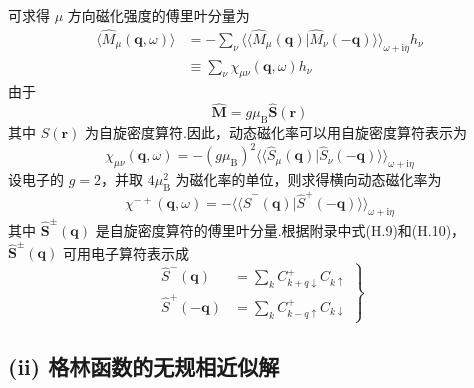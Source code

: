 可求得 $\mu$ 方向磁化强度的傅里叶分量为
\begin{equation}
\begin{aligned}
  \langle\hat{M}_{\mu}(\boldsymbol{q},\omega)\rangle&=-\sum_{\nu}
  \langle\langle\hat{M}_{\mu}(\boldsymbol{q})|\hat{M}_{\nu}(-\boldsymbol{q})\rangle\rangle_{\omega+\mathrm{i}\eta}h_{\nu}\\
  &\equiv\sum_{\nu}\chi_{\mu\nu}(\boldsymbol{q},\omega)h_{\nu}
\end{aligned}
\end{equation}
由于
\begin{equation}
  \hat{\boldsymbol{M}}=g\mu_{\mathrm{B}}\hat{\boldsymbol{S}}(\boldsymbol{r})
\end{equation}
其中 $S(\boldsymbol{r})$ 为自旋密度算符.因此，动态磁化率可以用自旋密度算符表示为
\begin{equation}
  \chi_{\mu\nu}(\boldsymbol{q},\omega)=-(g\mu_{\mathrm{B}})^{2}
  \langle\langle\hat{S}_{\mu}(\boldsymbol{q})|\hat{S}_{\nu}(-\boldsymbol{q})\rangle\rangle_{\omega+\mathrm{i}\eta}
\end{equation}
设电子的 $g=2$，并取 $4\mu_{\mathrm{B}}^{2}$ 为磁化率的单位，则求得横向动态磁化率为
\begin{equation}
  \chi^{-+}(\boldsymbol{q},\omega)=-\langle\langle\hat{S}^{-}(\boldsymbol{q})|\hat{S}^{+}(-\boldsymbol{q})\rangle\rangle_{\omega+\mathrm{i}\eta}
\end{equation}
其中 $\hat{\boldsymbol{S}}^{\pm}(\boldsymbol{q})$ 是自旋密度算符的傅里叶分量.根据附录中式(H.9)和(H.10)，$\hat{\boldsymbol{S}}^{\pm}(\boldsymbol{q})$ 可用电子算符表示成
\begin{equation}
\left.\begin{aligned}
  \hat{S}^{-}(\boldsymbol{q})&=\sum_{k}C_{k+q\downarrow}^{+}C_{k\uparrow}\\
  \hat{S}^{+}(-\boldsymbol{q})&=\sum_{k}C_{k-q\uparrow}^{+}C_{k\downarrow}
\end{aligned}\right\}
\end{equation}

\subsection*{(ii) 格林函数的无规相近似解}

